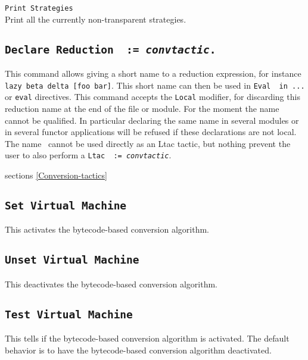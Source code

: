 \begin{Variants}
\item {\tt Print Strategies}\\
  Print all the currently non-transparent strategies.
\end{Variants}

\subsection{\tt Declare Reduction \ident\ := {\rm\sl convtactic}.}

This command allows giving a short name to a reduction expression,
for instance {\tt lazy beta delta [foo bar]}. This short name can
then be used in {\tt Eval \ident\ in ...} or {\tt eval} directives.
This command accepts the {\tt Local} modifier, for discarding
this reduction name at the end of the file or module. For the moment
the name cannot be qualified. In particular declaring the same name
in several modules or in several functor applications will be refused
if these declarations are not local. The name \ident\ cannot be used
directly as an Ltac tactic, but nothing prevent the user to also
perform a {\tt Ltac \ident\ := {\rm\sl convtactic}}.

\SeeAlso sections \ref{Conversion-tactics}

\subsection{\tt Set Virtual Machine
\label{SetVirtualMachine}
}

This activates the bytecode-based conversion algorithm.

\subsection{\tt Unset Virtual Machine
}

This deactivates the bytecode-based conversion algorithm.

\subsection{\tt Test Virtual Machine
}

This tells if the bytecode-based conversion algorithm is
activated. The default behavior is to have the bytecode-based
conversion algorithm deactivated.

